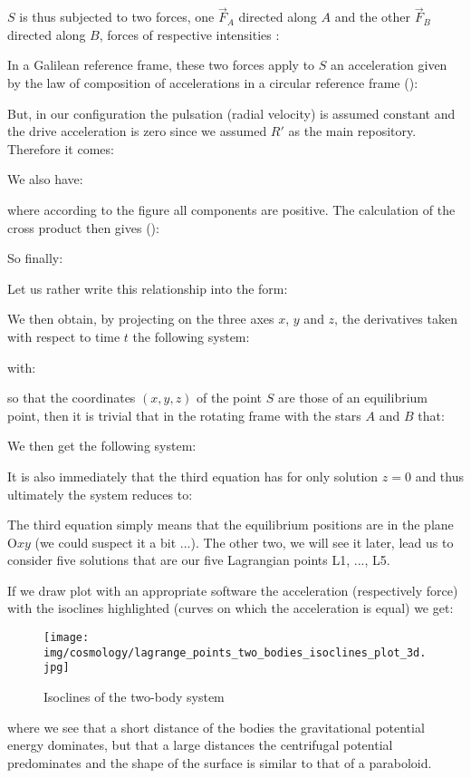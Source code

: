 	$S$ is thus subjected to two forces, one $\vec{F}_A$ directed along $A$ and the other $\vec{F}_B$ directed along $B$, forces of respective intensities :
	
	In a Galilean reference frame, these two forces apply to $S$ an acceleration given by the law of composition of accelerations in a circular reference frame ():
	
	But, in our configuration the pulsation (radial velocity) is assumed constant and the drive acceleration is zero since we assumed $R'$ as the main repository. Therefore it comes:
	
	We also have:
	
	where according to the figure all components are positive. The calculation of the cross product then gives ():
	
	So finally:
	
	Let us rather write this relationship into the form:
	
	We then obtain, by projecting on the three axes $x$, $y$ and $z$, the derivatives taken with respect to time $t$ the following system:
	
	with:
	
	so that the coordinates $(x,y,z)$ of the point $S$ are those of an equilibrium point, then it is trivial that in the rotating frame with the stars $A$ and $B$ that:
	
	We then get the following system:
	
	It is also immediately that the third equation has for only solution $z=0$ and thus ultimately the system reduces to:
	
	The third equation simply means that the equilibrium positions are in the plane O$xy$ (we could suspect it a bit ...). The other two, we will see it later, lead us to consider five solutions that are our five Lagrangian points L1, ..., L5.

	If we draw plot with an appropriate software the acceleration (respectively force) with the isoclines highlighted (curves on which the acceleration is equal) we get:
	\begin{figure}[H]
		\centering
		\texttt{[image: img/cosmology/lagrange\_points\_two\_bodies\_isoclines\_plot\_3d.jpg]}	
		\caption{Isoclines of the two-body system}
	\end{figure}
	where we see that a short distance of the bodies the gravitational potential energy dominates, but that a large distances the centrifugal potential predominates and the shape of the surface is similar to that of a paraboloid.

